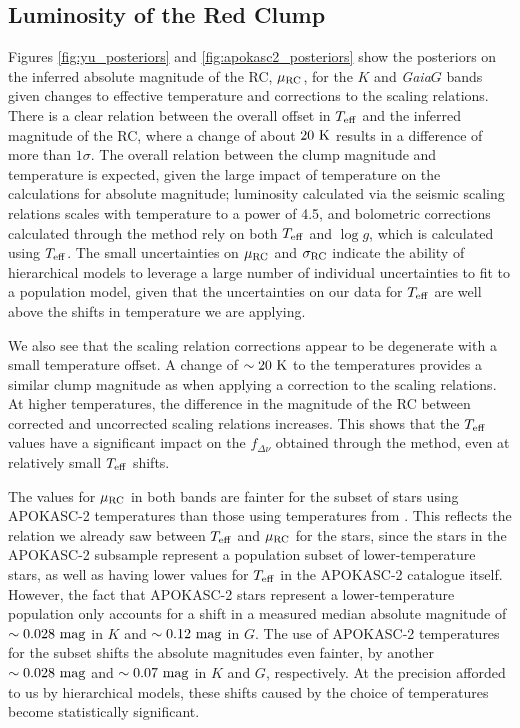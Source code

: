 \documentclass[fleqn,usenatbib]{mnras}
\newcommand{\murc}{\mbox{$\mu_{\rm RC}$}\xspace}
\newcommand{\sigrc}{\mbox{$\sigma_{\rm RC}$}\xspace}
\newcommand{\fdnu}{\mbox{$f_{\Delta\nu}$}\xspace}
\newcommand{\teff}{\mbox{$T_{\rm eff}$}\xspace}
\newcommand{\logg}{\mbox{$\log g$}\xspace}
\newcommand{\gaia}{\emph{Gaia}\xspace}
\newcommand{\new}[1]{#1}
\newcommand{\nnew}[1]{#1}
\newcommand{\up}[1]{#1}
\begin{document}
\subsection{Luminosity of the Red Clump}
\nnew{Figures \ref{fig:yu_posteriors} and \ref{fig:apokasc2_posteriors} show the posteriors on the inferred absolute magnitude of the RC, \murc, for the $K$ and \gaia $G$ bands given changes to effective temperature and corrections to the scaling relations.} There is a clear relation between the overall offset in \teff and the inferred magnitude of the RC, where a change of about $20\ \rm{K}$ results in a difference of more than $1\sigma$. The overall relation between the clump magnitude and temperature is expected, given the large impact of temperature on the calculations for absolute magnitude; luminosity calculated via the seismic scaling relations scales with temperature to a power of 4.5, and bolometric corrections calculated through the \cite{art:casagrande+vandenberg2018} method rely on both \teff and \logg, which is calculated using \teff. \new{The small uncertainties on \murc and \sigrc indicate the ability of hierarchical models to leverage a large number of individual uncertainties to fit to a population model, given that the uncertainties on our data for \teff are well above the shifts in temperature we are applying.}

We also see that the scaling relation corrections appear to be degenerate with a small temperature offset. A change of $\sim 20\ \rm{K}$ to the temperatures provides a similar clump magnitude as when applying a correction to the scaling relations. At higher temperatures, the difference in the magnitude of the RC between corrected and uncorrected scaling relations increases. This shows that the \teff values have a significant impact on the \fdnu obtained through the \cite{art:sharma+stello2016} method, even at relatively small \teff shifts. 

The values for \murc in both bands are fainter for the subset of stars using APOKASC-2 temperatures than those using temperatures from \cite{art:mathur+2017}. This reflects the relation we already saw between \teff and \murc for the  stars, since the stars in the APOKASC-2 subsample represent a population subset of lower-temperature stars, as well as having lower values for \teff in the APOKASC-2 catalogue itself. However, the fact that APOKASC-2 stars represent a lower-temperature population only accounts for a shift in a measured median absolute magnitude of $\sim0.028\ \rm mag$ in $K$ and $\sim0.12\ \rm mag$ in $G$. The use of APOKASC-2 temperatures for the subset shifts the absolute magnitudes even fainter, by another $\sim 0.028\ \rm mag$ and $\sim 0.07\ \rm mag$ in $K$ and $G$, respectively. \up{At the precision afforded to us by hierarchical models, these shifts caused by the choice of temperatures become statistically significant.}
\end{document}
